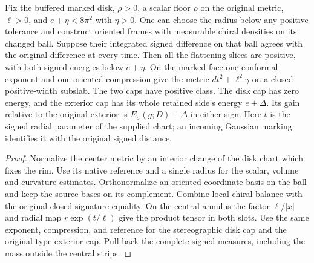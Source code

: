 \begin{proposition}
\label{prop:ed46-finite-caps}
\leanok
Fix the buffered marked disk, $\rho>0$, a scalar floor $\rho$ on
the original metric, $\ell>0$, and $e+\eta<8\pi^2$ with $\eta>0$.
One can choose the radius below any positive tolerance and construct
oriented frames with measurable chiral densities on its changed ball.
Suppose their integrated signed difference on that ball agrees with
the original difference at every time. Then all the
flattening slices are positive, with both signed energies below
$e+\eta$. On the marked face one conformal exponent and one oriented
compression give the metric $dt^2+\ell^2\gamma$ on a closed
positive-width subslab. The two caps have positive class. The disk cap
has zero energy, and the exterior cap has its whole retained side's
energy $e+\Delta$. Its gain relative to the original exterior is
$E_\sigma(g;D)+\Delta$ in either sign. Here $t$ is the signed radial
parameter of the supplied chart; an incoming Gaussian marking identifies
it with the original signed distance.
\end{proposition}
\begin{proof}
\leanok
Normalize the center metric by an interior change of the disk chart
which fixes the rim. Use its native reference and a single radius for
the scalar, volume and curvature estimates. Orthonormalize an oriented
coordinate basis on the ball and keep the source bases on its
complement. Combine local chiral balance with the original closed
signature equality. On the central annulus the factor $\ell/|x|$ and
radial map $r\exp(t/\ell)$ give the product tensor in both slots.
Use the same exponent, compression, and reference for the stereographic
disk cap and the original-type exterior cap. Pull back the complete
signed measures, including the mass outside the central strips.
\end{proof}

